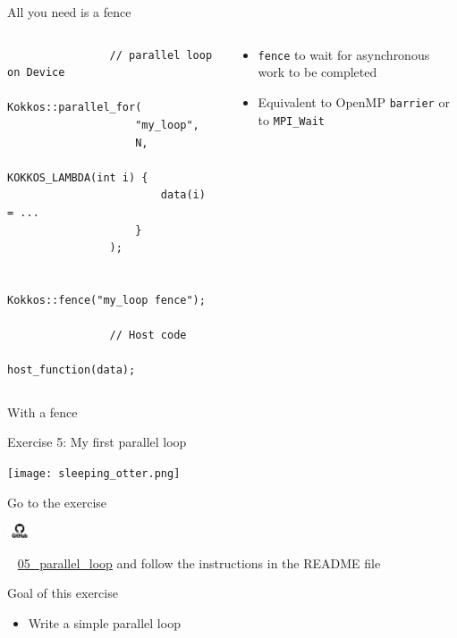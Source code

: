 \documentclass[aspectratio=169]{beamer}
\newcommand{\githublink}[2][2em]{%
    \hspace{-0.25em}%
    \parbox[c][#1][c]{#1}{%
        \includegraphics[width=#1]{GitHub-logo.png}%
    }%
    \hspace{-0.25em}%
    ~%
    #2%
}
\begin{document}
\begin{frame}[fragile]{All you need is a fence}
    \begin{columns}
        \begin{column}{0.5\linewidth}
            \begin{verbatim}
                // parallel loop on Device
                Kokkos::parallel_for(
                    "my_loop",
                    N,
                    KOKKOS_LAMBDA(int i) {
                        data(i) = ...
                    }
                );

                Kokkos::fence("my_loop fence");

                // Host code
                host_function(data);
            \end{verbatim}
        \end{column}
        \begin{column}{0.5\linewidth}
            \begin{itemize}
                \item \texttt{fence} to wait for asynchronous work to be completed
                \item Equivalent to OpenMP \texttt{barrier} or to \texttt{MPI\_Wait}
            \end{itemize}
        \end{column}
    \end{columns}

    \vspace{1em}
     With a fence
\end{frame}


\begin{frame}{Exercise 5: My first parallel loop}
    \begin{center}
        \texttt{[image: sleeping\_otter.png]}
    \end{center}

    Go to the exercise \githublink{\href{https://github.com/CExA-project/cexa-kokkos-tutorials/tree/main/exercises/05_parallel_loop}{05\_parallel\_loop}} and follow the instructions in the README file

    \begin{block}{Goal of this exercise}
        \begin{itemize}
            \item Write a simple parallel loop
        \end{itemize}
    \end{block}
\end{frame}
\end{document}
